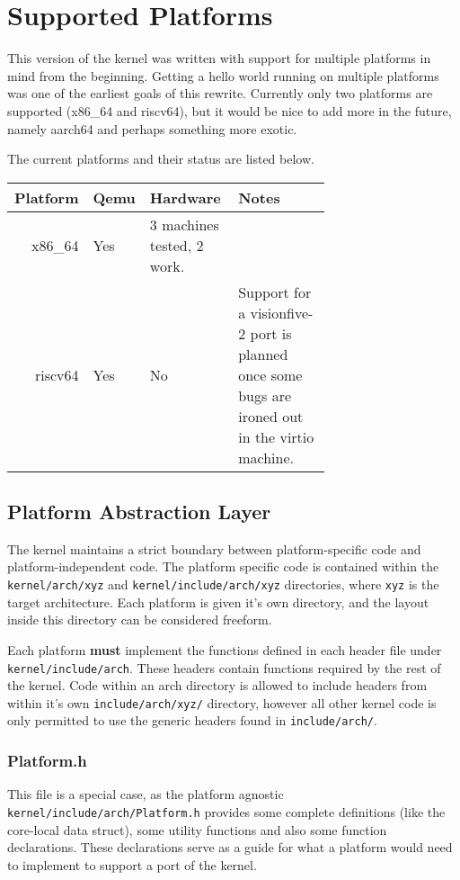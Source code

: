 \section{Supported Platforms}
This version of the kernel was written with support for multiple platforms in mind from the beginning. Getting a hello world running on multiple platforms was one of the earliest goals of this rewrite. Currently only two platforms are supported (x86\_64 and riscv64), but it would be nice to add more in the future, namely aarch64 and perhaps something more exotic.

The current platforms and their status are listed below.

\begin{tabular}{|r|l|p{0.3\linewidth}|p{0.4\linewidth}|}
    \hline
    \textbf{Platform} & \textbf{Qemu} & \textbf{Hardware} & \textbf{Notes} \\
    \hline
    x86\_64 & Yes & 3 machines tested, 2 work. & \\
    riscv64 & Yes & No & Support for a visionfive-2 port is planned once some bugs are ironed out in the virtio machine.\\
    \hline
\end{tabular}

\subsection{Platform Abstraction Layer}
The kernel maintains a strict boundary between platform-specific code and platform-independent code. The platform specific code is contained within the \verb|kernel/arch/xyz| and \verb|kernel/include/arch/xyz| directories, where \verb|xyz| is the target architecture. Each platform is given it's own directory, and the layout inside this directory can be considered freeform.

Each platform \textbf{must} implement the functions defined in each header file under \verb|kernel/include/arch|. These headers contain functions required by the rest of the kernel. Code within an arch directory is allowed to include headers from within it's own \verb|include/arch/xyz/| directory, however all other kernel code is only permitted to use the generic headers found in \verb|include/arch/|.

\subsubsection{Platform.h}
This file is a special case, as the platform agnostic \verb|kernel/include/arch/Platform.h| provides some complete definitions (like the core-local data struct), some utility functions and also some function declarations. These declarations serve as a guide for what a platform would need to implement to support a port of the kernel. 

